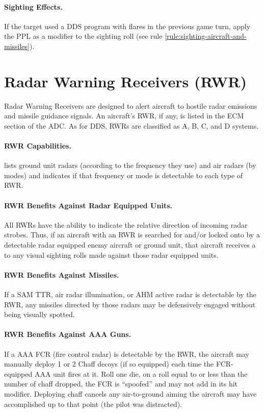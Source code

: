 \begin{advancedrules}
\paragraph{Sighting Effects.} If the target used a DDS program with flares in the previous game turn, apply the PPL as a modifier to the sighting roll (see rule \ref{rule:sighting-aircraft-and-missiles}).


\section{Radar Warning Receivers (RWR)}
\label{rule:rwr}

Radar Warning Receivers are designed to alert aircraft to hostile radar emissions and missile guidance signals. An aircraft's RWR, if any, is listed in the ECM section of the ADC. As for DDS, RWRs are classified as A, B, C, and D systems.

\paragraph{RWR Capabilities.}  lists ground unit radars (according to the frequency they use) and air radars (by modes) and indicates if that frequency or mode is detectable to each type of RWR.

\paragraph{RWR Benefits Against Radar Equipped Units.} All RWRs have the ability to indicate the relative direction of incoming radar strobes. Thus, if an aircraft with an RWR is searched for and/or locked onto by a detectable radar equipped enemy aircraft or ground unit, that aircraft receives a  to any visual sighting rolls made against those radar equipped units.

\paragraph{RWR Benefits Against Missiles.} If a SAM TTR, air radar illumination, or AHM active radar is detectable by the RWR, any missiles directed by those radars may be defensively engaged without being visually spotted.

\paragraph{RWR Benefits Against AAA Guns.} If a AAA FCR (fire control radar) is detectable by the RWR, the aircraft may manually deploy 1 or 2 Chaff decoys (if so equipped) each time the FCR-equipped AAA unit fires at it. Roll one die, on a roll equal to or less than the number of chaff dropped, the FCR is “spoofed” and may not add in its hit modifier. Deploying chaff cancels any air-to-ground aiming the aircraft may have accomplished up to that point (the pilot was distracted).


\end{advancedrules}
